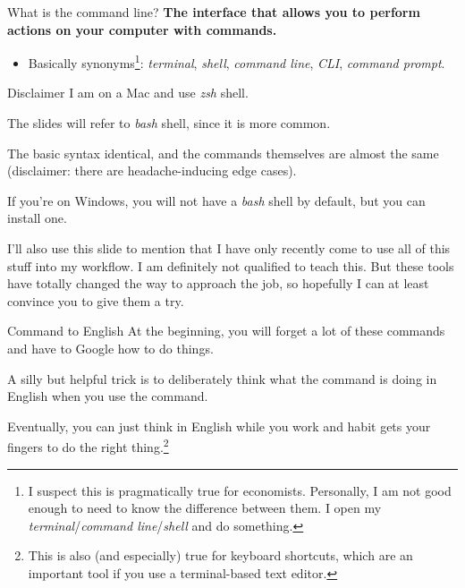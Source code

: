 
\begin{frame}{What is the command line?}
    \textbf{The interface that allows you to perform actions on your computer with commands.}

    \begin{itemize}
        \item Basically synonyms\footnote{I suspect this is pragmatically true for economists.
        Personally, I am not good enough to need to know the difference between them.
    I open my \textit{terminal}/\textit{command line}/\textit{shell} and do something.}:
    \textit{terminal}, \textit{shell}, \textit{command line}, \textit{CLI}, \textit{command prompt}.
    \end{itemize}
\end{frame}

\begin{frame}{Disclaimer}
    \footnotesize
    I am on a Mac and use \textit{zsh} shell.

    The slides will refer to \textit{bash} shell, since it is more common.

    The basic syntax identical, and the commands themselves are almost the same
    (disclaimer: there are headache-inducing edge cases).

    If you're on Windows, you will not have a \textit{bash} shell by default,
    but you can install one.

    I'll also use this slide to mention that I have only recently come to use
    all of this stuff into my workflow.
    I am definitely not qualified to teach this.
    But these tools have totally changed the way to approach the job,
    so hopefully I can at least convince you to give them a try.

\end{frame}

\begin{frame}{Command to English}
    \stretchon
    At the beginning, you will forget a lot of these commands and have to Google
    how to do things.

    A silly but helpful trick is to deliberately think what the command is doing in English
    when you use the command.

    Eventually, you can just think in English while you work and habit gets your
    fingers to do the right thing.\footnote{This is also (and especially) true
    for keyboard shortcuts, which are an important tool if you use a terminal-based
    text editor.}

\end{frame}

